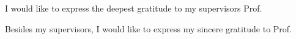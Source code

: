 \begin{acknowledgments}
I would like to express the deepest gratitude to my supervisors Prof. 

Besides my supervisors, I would like to express my sincere gratitude to Prof.



\begin{flushright}
  \textbf{\theauthor}\\
  \textbf{\the\year}
\end{flushright}

\end{acknowledgments}

